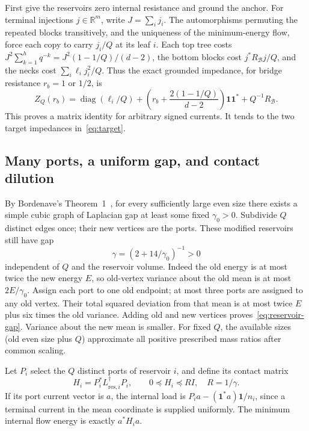 \documentclass[11pt]{article}
\newcommand{\diag}{\operatorname{diag}}
\newcommand{\one}{\boldsymbol 1}
\newcommand{\R}{\mathbb R}
\begin{document}
First give the reservoirs zero internal resistance and ground the
anchor. For terminal injections $j\in\R^m$, write $J=\sum_i j_i$.
The automorphisms permuting the repeated blocks transitively, and the
uniqueness of the minimum-energy flow, force each copy to carry
$j_i/Q$ at its leaf $i$. Each top tree costs
$J^2\sum_{k=1}^h q^{-k}=J^2(1-1/Q)/(d-2)$, the bottom
blocks cost $j^*R_{\mathcal B}j/Q$, and the necks cost
$\sum_i\ell_i j_i^2/Q$. Thus the exact grounded impedance, for bridge
resistance $r_b=1$ or $1/2$, is
\begin{equation}\label{eq:ideal-impedance}
 Z_Q(r_b)=\diag(\ell_i/Q)+\left(r_b+\frac{2(1-1/Q)}{d-2}\right)\one\one^*
                                      +Q^{-1}R_{\mathcal B}.
\end{equation}
This proves a matrix identity for arbitrary signed currents. It tends
to the two target impedances in~\eqref{eq:target}.

\subsection{Many ports, a uniform gap, and contact dilution}
By Bordenave's Theorem~1~\cite{Bordenave}, for every sufficiently large
even size there exists a simple cubic graph of Laplacian gap at least
some fixed $\gamma_0>0$. Subdivide $Q$ distinct edges once; their new
vertices are the ports. These modified reservoirs still have gap
\begin{equation}\label{eq:reservoir-gap}
                    \gamma=(2+14/\gamma_0)^{-1}>0
\end{equation}
independent of $Q$ and the reservoir volume. Indeed the old energy is
at most twice the new energy $E$, so old-vertex variance about the old
mean is at most $2E/\gamma_0$. Assign each port to one old endpoint;
at most three ports are assigned to any old vertex. Their total squared
deviation from that mean is at most twice $E$ plus six times the old
variance. Adding old and new vertices proves~\eqref{eq:reservoir-gap}.
Variance about the new mean is smaller. For fixed $Q$, the available
sizes (old even size plus $Q$) approximate all positive prescribed
mass ratios after common scaling.

Let $P_i$ select the $Q$ distinct ports of reservoir $i$, and define
its contact matrix
\[
 H_i=P_i^*L_{\mathrm{res},i}^\dagger P_i,
                     \qquad0\preceq H_i\preceq R I,\quad R=1/\gamma.
\]
If its port current vector is $a$, the internal load is
$P_ia-(\one^*a)\one/n_i$, since a terminal current in the mean
coordinate is supplied uniformly. The minimum internal flow energy
is exactly $a^*H_i a$.
\end{document}

